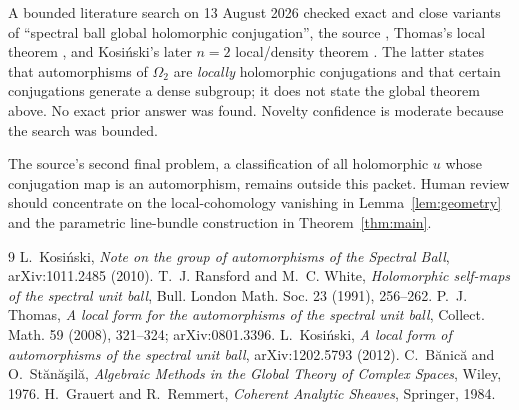 \documentclass[11pt]{article}
\begin{document}
A bounded literature search on 13 August 2026 checked exact and close variants
of ``spectral ball global holomorphic conjugation'', the source
\cite{Kosinski2010}, Thomas's local theorem \cite{Thomas2008}, and Kosi\'nski's
later $n=2$ local/density theorem \cite{Kosinski2012}.  The latter states that
automorphisms of $\Omega_2$ are \emph{locally} holomorphic conjugations and
that certain conjugations generate a dense subgroup; it does not state the
global theorem above.  No exact prior answer was found.  Novelty confidence is
moderate because the search was bounded.

The source's second final problem, a classification of all holomorphic $u$
whose conjugation map is an automorphism, remains outside this packet.  Human
review should concentrate on the local-cohomology vanishing in
Lemma~\ref{lem:geometry} and the parametric line-bundle construction in
Theorem~\ref{thm:main}.

\begin{thebibliography}{9}
L.~Kosi\'nski, \emph{Note on the group of automorphisms of the Spectral Ball},
arXiv:1011.2485 (2010).
T.~J. Ransford and M.~C. White, \emph{Holomorphic self-maps of the spectral
unit ball}, Bull. London Math. Soc. 23 (1991), 256--262.
P.~J. Thomas, \emph{A local form for the automorphisms of the spectral unit
ball}, Collect. Math. 59 (2008), 321--324; arXiv:0801.3396.
L.~Kosi\'nski, \emph{A local form of automorphisms of the spectral unit ball},
arXiv:1202.5793 (2012).
C.~B\u anic\u a and O.~St\u an\u a\c sil\u a,
\emph{Algebraic Methods in the Global Theory of Complex Spaces},
Wiley, 1976.
H.~Grauert and R.~Remmert, \emph{Coherent Analytic Sheaves}, Springer, 1984.
\end{thebibliography}
\end{document}
